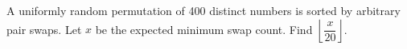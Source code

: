 A uniformly random permutation of 400 distinct numbers is sorted by arbitrary pair swaps. Let $x$ be the expected minimum swap count. Find $\left\lfloor\dfrac{x}{20}\right\rfloor$.
